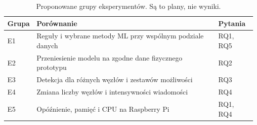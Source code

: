 \begin{table}[htbp]
\centering\small
\caption{Proponowane grupy eksperymentów. Są to plany, nie wyniki.}
\label{tab:experiment-plan}
\begin{tabularx}{\textwidth}{@{}lXl@{}}
\toprule
Grupa & Porównanie & Pytania \\
\midrule
E1 & Reguły i wybrane metody ML przy wspólnym podziale danych & RQ1, RQ5 \\
E2 & Przeniesienie modelu na zgodne dane fizycznego prototypu & RQ2 \\
E3 & Detekcja dla różnych węzłów i zestawów możliwości & RQ3 \\
E4 & Zmiana liczby węzłów i intensywności wiadomości & RQ4 \\
E5 & Opóźnienie, pamięć i CPU na Raspberry Pi & RQ1, RQ4 \\
\bottomrule
\end{tabularx}
\end{table}
